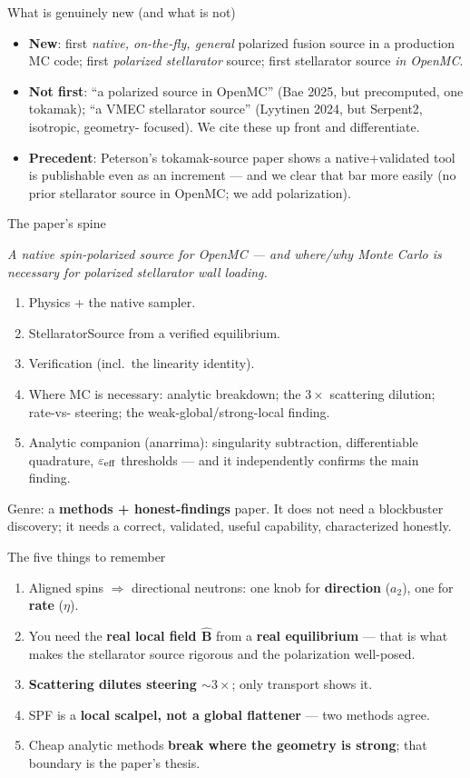 \documentclass[11pt,aspectratio=169]{beamer}
\newcommand{\key}[1]{\textcolor{key}{\textbf{#1}}}
\newcommand{\bhat}{\hat{\mathbf{B}}}
\newcommand{\qq}[1]{\begin{center}\emph{#1}\end{center}}
\begin{document}
\begin{frame}{What is genuinely new (and what is not)}
\begin{itemize}
\item \key{New}: first \emph{native, on-the-fly, general} polarized fusion source in a
production MC code; first \emph{polarized stellarator} source; first stellarator source
\emph{in OpenMC}.
\item \key{Not first}: ``a polarized source in OpenMC'' (Bae 2025, but precomputed, one
tokamak); ``a VMEC stellarator source'' (Lyytinen 2024, but Serpent2, isotropic, geometry-
focused). We cite these up front and differentiate.
\item \key{Precedent}: Peterson's tokamak-source paper shows a native+validated tool is
publishable even as an increment --- and we clear that bar more easily (no prior stellarator
source in OpenMC; we add polarization).
\end{itemize}
\end{frame}

\begin{frame}{The paper's spine}
\qq{A native spin-polarized source for OpenMC --- and where/why Monte Carlo is necessary for
polarized stellarator wall loading.}
\begin{enumerate}\small
\item Physics + the native sampler.
\item StellaratorSource from a verified equilibrium.
\item Verification (incl.\ the linearity identity).
\item Where MC is necessary: analytic breakdown; the $3\times$ scattering dilution; rate-vs-
steering; the weak-global/strong-local finding.
\item Analytic companion (anarrima): singularity subtraction, differentiable quadrature,
$\varepsilon_{\rm eff}$ thresholds --- and it independently confirms the main finding.
\end{enumerate}
Genre: a \key{methods + honest-findings} paper. It does not need a blockbuster discovery; it
needs a correct, validated, useful capability, characterized honestly.
\end{frame}

\begin{frame}{The five things to remember}
\begin{enumerate}
\item Aligned spins $\Rightarrow$ directional neutrons: one knob for \key{direction} ($a_2$),
one for \key{rate} ($\eta$).
\item You need the \key{real local field $\bhat$} from a \key{real equilibrium} --- that is
what makes the stellarator source rigorous and the polarization well-posed.
\item \key{Scattering dilutes steering $\sim\!3\times$}; only transport shows it.
\item SPF is a \key{local scalpel, not a global flattener} --- two methods agree.
\item Cheap analytic methods \key{break where the geometry is strong}; that boundary is the
paper's thesis.
\end{enumerate}
\end{frame}
\end{document}
